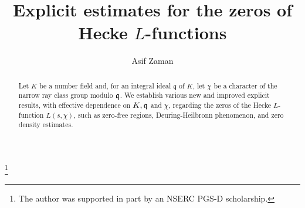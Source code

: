 \documentclass[12pt,psamsfonts]{amsart}
\theoremstyle{definition}
\theoremstyle{remark}
\numberwithin{equation}{section}
\begin{document}



\title{Explicit estimates for the zeros of Hecke $L$-functions}

\author{Asif Zaman}
\address{
Department of Mathematics, University of Toronto \\
Room 6290, 40 St. George St., M5S2E4, Toronto, ON, Canada}
\thanks{The author was supported in part by an NSERC PGS-D scholarship.}

\date{}



\begin{abstract} Let $K$ be a number field and, for an integral ideal $\mathfrak{q}$ of $K$, let $\chi$ be a character of the narrow ray class group modulo $\mathfrak{q}$. We establish various new and improved explicit results, with effective dependence on $K, \mathfrak{q}$ and $\chi$, regarding the zeros of the Hecke $L$-function $L(s,\chi)$, such as zero-free regions, Deuring-Heilbronn phenomenon, and zero density estimates.
\end{abstract}

\maketitle

\tableofcontents

\end{document}
